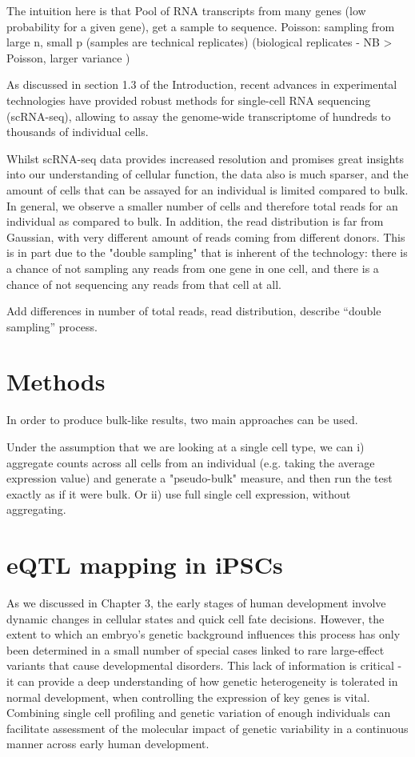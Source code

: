 The intuition here is that 
Pool of RNA transcripts from many genes (low probability for a given gene), get a sample to sequence. Poisson: sampling from large n, small p (samples are technical replicates)
(biological replicates - NB > Poisson, larger variance )

As discussed in section 1.3 of the Introduction, recent advances in experimental technologies have provided robust methods for single-cell RNA sequencing (scRNA-seq), allowing to assay the genome-wide transcriptome of hundreds to thousands of individual cells. 

Whilst scRNA-seq data provides increased resolution and promises great insights into our understanding of cellular function, the data also is much sparser, and the amount of cells that can be assayed for an individual is limited compared to bulk.
In general, we observe a smaller number of cells and therefore total reads for an individual as compared to bulk. 
In addition, the read distribution is far from Gaussian, with very different amount of reads coming from different donors. 
This is in part due to the "double sampling" that is inherent of the technology: there is a chance of not sampling any reads from one gene in one cell, and there is a chance of not sequencing any reads from that cell at all.

Add differences in number of total reads, read distribution, describe “double sampling” process.

\section{Methods}

In order to produce bulk-like results, two main approaches can be used.

Under the assumption that we are looking at a single cell type, we can i) aggregate counts across all cells from an individual (e.g. taking the average expression value) and generate a "pseudo-bulk" measure, and then run the test exactly as if it were bulk. 
Or ii) use full single cell expression, without aggregating.

\section{eQTL mapping in iPSCs}

As we discussed in Chapter 3, the early stages of human development involve dynamic changes in cellular states and quick cell fate decisions. 
However, the extent to which an embryo’s genetic background influences this process has only been determined in a small number of special cases linked to rare large-effect variants that cause developmental disorders. 
This lack of information is critical - it can provide a deep understanding of how genetic heterogeneity is tolerated in normal development, when controlling the expression of key genes is vital. 
Combining single cell profiling and genetic variation of enough individuals can facilitate assessment of the molecular impact of genetic variability in a continuous manner across early human development.\\
 
